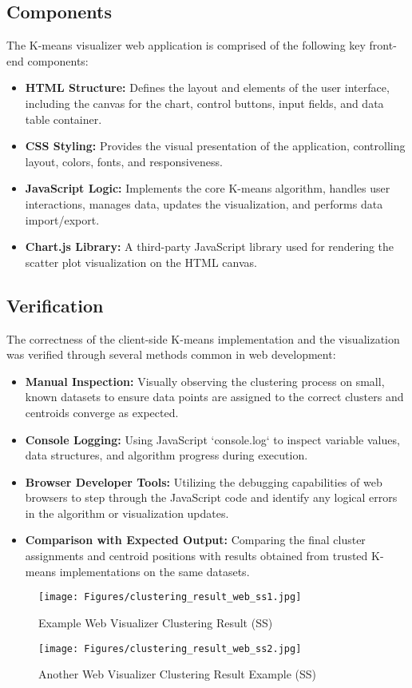 \documentclass[12pt]{report}
\begin{document}
\subsection{Components}
The K-means visualizer web application is comprised of the following key front-end components:
\begin{itemize}
  \item \textbf{HTML Structure:} Defines the layout and elements of the user interface, including the canvas for the chart, control buttons, input fields, and data table container.
  \item \textbf{CSS Styling:} Provides the visual presentation of the application, controlling layout, colors, fonts, and responsiveness.
  \item \textbf{JavaScript Logic:} Implements the core K-means algorithm, handles user interactions, manages data, updates the visualization, and performs data import/export.
  \item \textbf{Chart.js Library:} A third-party JavaScript library used for rendering the scatter plot visualization on the HTML canvas.
\end{itemize}
\subsection{Verification}
The correctness of the client-side K-means implementation and the visualization was verified through several methods common in web development:
\begin{itemize}
    \item \textbf{Manual Inspection:} Visually observing the clustering process on small, known datasets to ensure data points are assigned to the correct clusters and centroids converge as expected.
    \item \textbf{Console Logging:} Using JavaScript `console.log` to inspect variable values, data structures, and algorithm progress during execution.
    \item \textbf{Browser Developer Tools:} Utilizing the debugging capabilities of web browsers to step through the JavaScript code and identify any logical errors in the algorithm or visualization updates.
    \item \textbf{Comparison with Expected Output:} Comparing the final cluster assignments and centroid positions with results obtained from trusted K-means implementations on the same datasets.
\end{itemize}
\begin{figure}[h]
        \centering
        \texttt{[image: Figures/clustering\_result\_web\_ss1.jpg]}
        \caption{Example Web Visualizer Clustering Result (SS)}
        \centering
        \texttt{[image: Figures/clustering\_result\_web\_ss2.jpg]}
        \caption{Another Web Visualizer Clustering Result Example (SS)}
\end{figure}
\newpage
\end{document}
